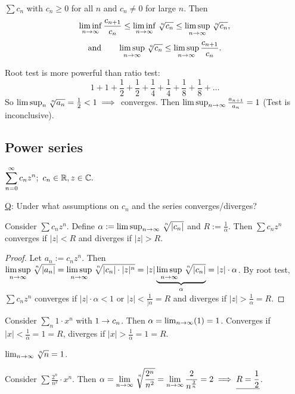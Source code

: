 \documentclass[]{article}
\begin{document}
\begin{theorem}
	$\sum c_n$ with $c_n\geq 0$ for all $n$ and $c_n\neq 0$ for large $n$. Then
	$$\liminf_{n\ra\infty}\frac{c_{n+1}}{c_n}\leq \liminf_{n\ra\infty}\nrt{n}{c_n}\leq \limsup_{n\ra\infty}\nrt{n}{c_n},$$
	$$\text{and}\qquad\limsup_{n\ra\infty}\nrt{n}{c_n}\leq\limsup_{n\ra\infty}\frac{c_{n+1}}{c_n}.$$
\end{theorem}
\begin{remark}
	Root test is more powerful than ratio test:
	$$1+1+\frac{1}{2}+\frac{1}{2}+\frac{1}{4}+\frac{1}{4}+\frac{1}{8}+\frac{1}{8}+\dots$$
	So $\limsup_{n}\nrt{n}{a_n} = \frac{1}{2} < 1 \implies$ converges.
	Then $\limsup_{n\rightarrow\infty}\frac{a_{n+1}}{a_n}=1$ (Test is inconclusive).
\end{remark}

\subsection{Power series}

\begin{definition}
	$\displaystyle\sum_{n=0}^\infty c_nz^n;\ c_n\in\mb R, z\in\mb C.$
\end{definition}

\ul{\ul{Q}}: Under what assumptions on $c_n$ and  the series converges/diverges?

\begin{theorem}
	Consider $\sum c_nz^n$. Define $\alpha:=\limsup_{n\ra\infty}\nrt{n}{|c_n|}$ and $R:=\frac{1}{\alpha}$.
	Then $\sum c_nz^n$ converges if $|z|<R$ and diverges if $|z|>R$.
\end{theorem}
\begin{proof}
	Let $a_n:=c_nz^n$. Then $\displaystyle\limsup_{n\ra\infty}\nrt{n}{|a_n|} = \limsup_{n\ra\infty}\nrt{n}{|c_n|\cdot|z|^n} = |z|\ub{\alpha}{\limsup_{n\ra\infty} \nrt{n}{|c_n|}} = |z|\cdot\alpha$.
	By root test, $\sum c_nz^n$ converges if $|z|\cdot\alpha<1$ or $|z|<\frac{1}{]\alpha} = R$ and diverges if $|z|>\frac{1}{\alpha} = R$.
\end{proof}
\begin{example}
	Consider $\sum_n 1\cdot x^n$ with $1\rightarrow c_n$. Then $\alpha = \lim_{n\rightarrow\infty}(1) = 1$.
	Converges if $|x|<\frac{1}{\alpha} = 1 = R$, diverges if $|x|>\frac{1}{\alpha}=1=R$.
\end{example}
\begin{recall}
	$\lim_{n\ra\infty} \nrt{n}{n} = 1$.
\end{recall}
\begin{example}
	Consider $\displaystyle\sum\frac{2^n}{n^2}\cdot x^n$. Then $\displaystyle\alpha = \lim_{n\ra\infty} \nrt{n}{\frac{2^n}{n^2}} = \lim_{n\ra\infty}\frac{2}{n^{\frac{2}{n}}} = 2 \implies \ul{R = \frac{1}{2}}$.
\end{example}
\end{document}
